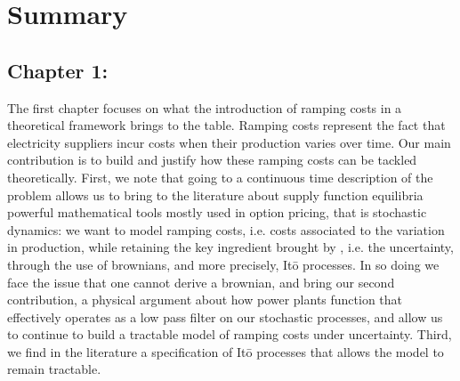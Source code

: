 \chapter*{Summary}

\doublespacing
\section*{Chapter 1: }

The first chapter focuses on what the introduction of ramping costs in a theoretical framework brings to the table. Ramping costs represent the fact that electricity suppliers incur costs when their production varies over time. Our main contribution is to build and justify how these ramping costs can be tackled theoretically. First, we note that going to a continuous time description of the problem allows us to bring to the literature about supply function equilibria powerful mathematical tools mostly used in option pricing, that is stochastic dynamics: we want to model ramping costs, i.e. costs associated to the variation in production, while retaining the key ingredient brought by \cite{KM}, i.e. the uncertainty, through the use of brownians, and more precisely, It\={o} processes. In so doing we face the issue that one cannot derive a brownian, and bring our second contribution, a physical argument about how power plants function that effectively operates as a low pass filter on our stochastic processes, and allow us to continue to build a tractable model of ramping costs under uncertainty. Third, we find in the literature a specification of It\={o} processes that allows the model to remain tractable. \\

